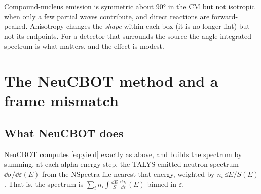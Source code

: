 \begin{pitfall}
Compound-nucleus emission is symmetric about \ang{90} in the CM but not isotropic when only a few partial waves contribute, and direct reactions are forward-peaked. Anisotropy changes the \emph{shape} within each box (it is no longer flat) but not its endpoints. For a detector that surrounds the source the angle-integrated spectrum is what matters, and the effect is modest.
\end{pitfall}

\section{The NeuCBOT method and a frame mismatch}
\label{sec:frame}
\subsection{What NeuCBOT does}
NeuCBOT \cite{neucbot} computes \cref{eq:yield} exactly as above, and builds the spectrum by summing, at each alpha energy step, the TALYS emitted-neutron spectrum $\dd\sigma/\dd\varepsilon(E)$ from the NSpectra file nearest that energy, weighted by $n_i\,\dd E/S(E)$. That is, the spectrum is $\sum_i n_i\int \frac{\dd E}{S}\,\frac{\dd\sigma_i}{\dd\varepsilon}(E)$ binned in $\varepsilon$.

